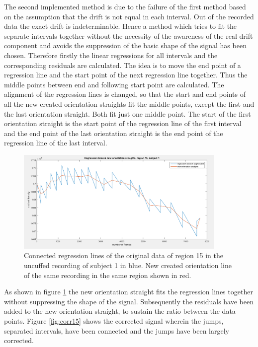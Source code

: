 The second implemented method is due to the failure of the first method based on the assumption that the drift is not equal in each interval. Out of the recorded data the exact drift is indeterminable. Hence a method which tries to fit the separate intervals together without the necessity of the awareness of the real drift component and avoids the suppression of the basic shape of the signal has been chosen.
Therefore firstly the linear regressions for all intervals and the corresponding residuals are calculated.
The idea is to move the end point of a regression line and the start point of the next regression line together. Thus the middle points between end and following start point are calculated. The alignment of the regression lines is changed, so that the start and end points of all the new created orientation straights fit the middle points, except the first and the last orientation straight. Both fit just one middle point. The start of the first orientation straight is the start point of the regression line of the first interval and the end point of the last orientation straight is the end point of the regression line of the last interval.
\begin{figure}[H]
	\includegraphics[width=0.9\textwidth]{figures/reg15}
	\caption{Connected regression lines of the original data of region 15 in the uncuffed recording of subject 1 in blue. New created orientation line of the same recording in the same region shown in red.}
	\label{fig:reg15}
\end{figure}
As shown in figure \ref{fig:reg15} the new orientation straight fits the regression lines together without suppressing the shape of the signal. Subsequently the residuals have been added to the new orientation straight, to sustain the ratio between the data points. Figure \ref{fig:corr15} shows the corrected signal wherein the jumps, separated intervals, have been connected and the jumps have been largely corrected.
